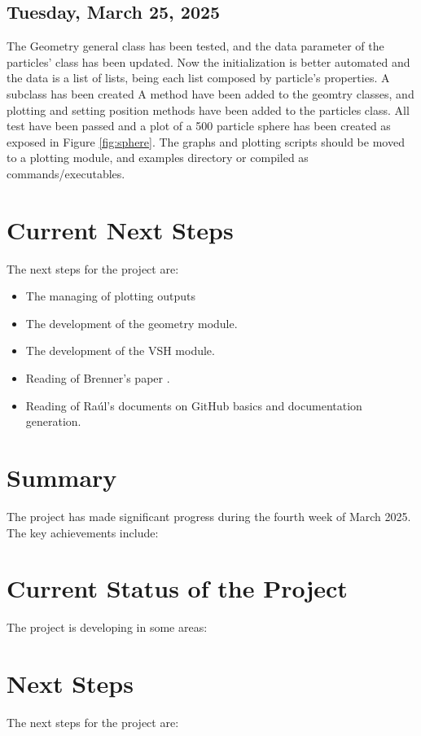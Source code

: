 \documentclass[12pt]{article}
\begin{document}
\subsection{Tuesday, March 25, 2025}
The Geometry general class has been tested, and the 
data parameter of the particles' class has been updated.
Now the initialization is better automated and the data
is a list of lists, being each list composed by particle's
properties. A  subclass has been created
A  method have been added to the geomtry
classes, and plotting and setting position methods have been
added to the particles class. All test have been passed and a
plot of a 500 particle sphere has been created as exposed in
Figure \ref{fig:sphere}.
The graphs and plotting scripts should be moved to a plotting
module, and examples directory or compiled as
commands/executables.

\section{Current Next Steps}
The next steps for the project are:
\begin{itemize}
    \item The managing of plotting outputs
    \item The development of the geometry module.
    \item The development of the VSH module.
    \item Reading of Brenner's paper \cite{BRENNER1961242}.
    \item Reading of Raúl's documents on GitHub basics and documentation generation.
\end{itemize}

\section{Summary}
The project has made significant progress during the fourth
week of March 2025. The key achievements include:


\section {Current Status of the Project}
The project is developing in some areas:


\section{Next Steps}
The next steps for the project are:

\printbibliography
\end{document}

